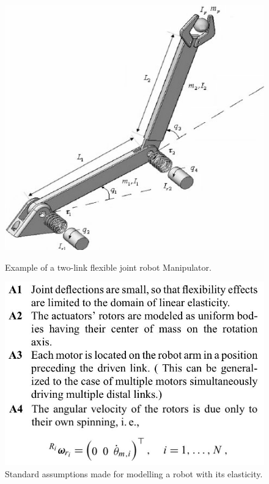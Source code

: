 \begin{center}
\begin{figure}[h]
\begin{minipage}[b]{0.45\linewidth}
\includegraphics[scale=0.3]{figures/Two-Link-Flexible-Joint-Robot-Manipulator_W640.jpg}
\caption{Example of a two-link flexible joint robot Manipulator.}
\label{fig:ejexample}
\end{minipage}
\hspace{0.5cm}
\begin{minipage}[b]{0.45\linewidth}
\includegraphics[width=\textwidth]{figures/assumptions.jpg}
\caption{Standard assumptions made for modelling a robot with its elasticity.}
\label{fig:assumpt}
\end{minipage}
\end{figure}
\end{center}

